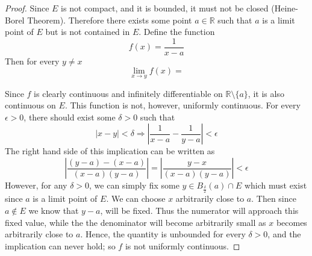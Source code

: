\documentclass{article}
\theoremstyle{definition}
\begin{document}
    \begin{proof}
        Since $E$ is not compact, and it is bounded, it must not be closed (Heine-Borel Theorem).
        Therefore there exists some point $a \in \mathbb{R}$ such that $a$ is a limit point of $E$ but
        is not contained in $E$. Define the function
        \[
            f(x) = \frac{1}{x-a}    
        \]
        Then for every $y \neq x$
        \[
            \lim_{x\rightarrow y} f(x) = 
        \]

        Since $f$ is clearly continuous and infinitely differentiable on $\mathbb{R} \setminus \{a\}$, it is also continuous on $E$. 
        This function is not, however, uniformly continuous.
        For every $\epsilon > 0$, there should exist some $\delta > 0$ such that 
        \[
            |x - y| < \delta \Longrightarrow \left|\frac{1}{x-a} - \frac{1}{y-a}\right| < \epsilon
        \]
        The right hand side of this implication can be written as 
        \[
            \left|\frac{(y-a) - (x - a)}{(x-a)(y-a)}\right| = \left|\frac{y-x}{(x-a)(y-a)}\right|
             < \epsilon
        \]
        However, for any $\delta > 0$, we can simply fix some $y \in B_{\frac{\delta}{2}}(a) \cap E$ which must exist 
        since $a$ is a limit point of $E$. We can choose $x$ arbitrarily close to $a$. Then since $a \notin E$ we know that $y - a$, will be fixed.
        Thus the numerator will approach this fixed value, while the the denominator will become arbitrarily small as $x$ becomes arbitrarily close to $a$.
        Hence, the quantity is unbounded for every $\delta > 0$, and the implication can never hold; so $f$ is not uniformly continuous.
    \end{proof}
\end{document}
